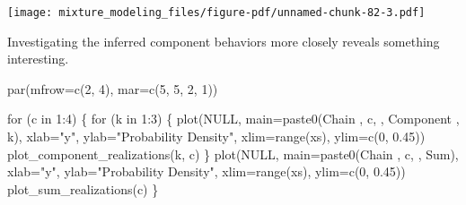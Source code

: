 \documentclass[
  letterpaper,
  DIV=11,
  numbers=noendperiod]{scrartcl}
\newenvironment{Shaded}{\begin{snugshade}}{\end{snugshade}}
\newcommand{\AttributeTok}[1]{\textcolor[rgb]{0.40,0.45,0.13}{#1}}
\newcommand{\ConstantTok}[1]{\textcolor[rgb]{0.56,0.35,0.01}{#1}}
\newcommand{\ControlFlowTok}[1]{\textcolor[rgb]{0.00,0.23,0.31}{#1}}
\newcommand{\DecValTok}[1]{\textcolor[rgb]{0.68,0.00,0.00}{#1}}
\newcommand{\FloatTok}[1]{\textcolor[rgb]{0.68,0.00,0.00}{#1}}
\newcommand{\FunctionTok}[1]{\textcolor[rgb]{0.28,0.35,0.67}{#1}}
\newcommand{\NormalTok}[1]{\textcolor[rgb]{0.00,0.23,0.31}{#1}}
\newcommand{\OtherTok}[1]{\textcolor[rgb]{0.00,0.23,0.31}{#1}}
\newcommand{\SpecialCharTok}[1]{\textcolor[rgb]{0.37,0.37,0.37}{#1}}
\newcommand{\StringTok}[1]{\textcolor[rgb]{0.13,0.47,0.30}{#1}}
\begin{document}
\begin{Shaded}
\end{Shaded}

\texttt{[image: mixture\_modeling\_files/figure-pdf/unnamed-chunk-82-3.pdf]}

Investigating the inferred component behaviors more closely reveals
something interesting.

\begin{Shaded}
\begin{Highlighting}[]
\FunctionTok{par}\NormalTok{(}\AttributeTok{mfrow=}\FunctionTok{c}\NormalTok{(}\DecValTok{2}\NormalTok{, }\DecValTok{4}\NormalTok{), }\AttributeTok{mar=}\FunctionTok{c}\NormalTok{(}\DecValTok{5}\NormalTok{, }\DecValTok{5}\NormalTok{, }\DecValTok{2}\NormalTok{, }\DecValTok{1}\NormalTok{))}

\ControlFlowTok{for}\NormalTok{ (c }\ControlFlowTok{in} \DecValTok{1}\SpecialCharTok{:}\DecValTok{4}\NormalTok{) \{}
  \ControlFlowTok{for}\NormalTok{ (k }\ControlFlowTok{in} \DecValTok{1}\SpecialCharTok{:}\DecValTok{3}\NormalTok{) \{}
    \FunctionTok{plot}\NormalTok{(}\ConstantTok{NULL}\NormalTok{, }\AttributeTok{main=}\FunctionTok{paste0}\NormalTok{(}\StringTok{\textquotesingle{}Chain \textquotesingle{}}\NormalTok{, c, }\StringTok{\textquotesingle{}, Component \textquotesingle{}}\NormalTok{, k),}
         \AttributeTok{xlab=}\StringTok{"y"}\NormalTok{, }\AttributeTok{ylab=}\StringTok{"Probability Density"}\NormalTok{,}
         \AttributeTok{xlim=}\FunctionTok{range}\NormalTok{(xs), }\AttributeTok{ylim=}\FunctionTok{c}\NormalTok{(}\DecValTok{0}\NormalTok{, }\FloatTok{0.45}\NormalTok{))}
    \FunctionTok{plot\_component\_realizations}\NormalTok{(k, c)}
\NormalTok{  \}}
  \FunctionTok{plot}\NormalTok{(}\ConstantTok{NULL}\NormalTok{, }\AttributeTok{main=}\FunctionTok{paste0}\NormalTok{(}\StringTok{\textquotesingle{}Chain \textquotesingle{}}\NormalTok{, c, }\StringTok{\textquotesingle{}, Sum\textquotesingle{}}\NormalTok{),}
       \AttributeTok{xlab=}\StringTok{"y"}\NormalTok{, }\AttributeTok{ylab=}\StringTok{"Probability Density"}\NormalTok{,}
       \AttributeTok{xlim=}\FunctionTok{range}\NormalTok{(xs), }\AttributeTok{ylim=}\FunctionTok{c}\NormalTok{(}\DecValTok{0}\NormalTok{, }\FloatTok{0.45}\NormalTok{))}
  \FunctionTok{plot\_sum\_realizations}\NormalTok{(c)}
\NormalTok{\}}
\end{Highlighting}
\end{Shaded}
\end{document}

